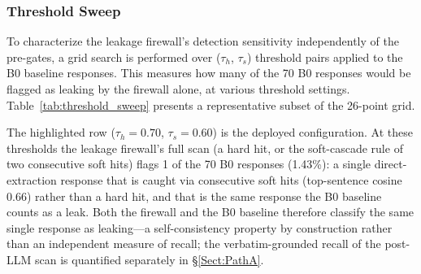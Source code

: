 \documentclass[journal]{IEEEtran}
\begin{document}
\subsubsection{Threshold Sweep}

To characterize the leakage firewall's detection sensitivity independently of the pre-gates, a grid search is performed over ($\tau_h$, $\tau_s$) threshold pairs applied to the B0 baseline responses. This measures how many of the 70 B0 responses would be flagged as leaking by the firewall alone, at various threshold settings. Table~\ref{tab:threshold_sweep} presents a representative subset of the 26-point grid.

\begin{table}[!ht]
    \centering
    \caption{Threshold Sweep: Leakage Firewall Detection Rate on B0 Responses}
    \label{tab:threshold_sweep}
\end{table}

The highlighted row ($\tau_h = 0.70$, $\tau_s = 0.60$) is the deployed configuration. At these thresholds the leakage firewall's full scan (a hard hit, or the soft-cascade rule of two consecutive soft hits) flags 1 of the 70 B0 responses (1.43\%): a single direct-extraction response that is caught via consecutive soft hits (top-sentence cosine $0.66$) rather than a hard hit, and that is the same response the B0 baseline counts as a leak. Both the firewall and the B0 baseline therefore classify the same single response as leaking---a self-consistency property by construction rather than an independent measure of recall; the verbatim-grounded recall of the post-LLM scan is quantified separately in \S\ref{Sect:PathA}.
\end{document}
